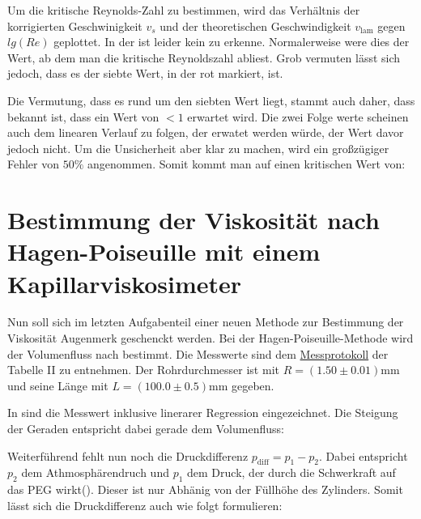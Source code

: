 Um die kritische Reynolds-Zahl zu bestimmen, wird das Verhältnis der korrigierten Geschwinigkeit $v_s$ und der theoretischen Geschwindigkeit $v_\text{lam}$ gegen $lg(Re)$ geplottet. 
In der  ist leider kein  zu erkenne. Normalerweise were dies der Wert, ab dem man die kritische Reynoldszahl abliest. Grob vermuten lässt sich jedoch, dass es der siebte Wert, in der  rot markiert, ist.


Die Vermutung, dass es rund um den siebten Wert liegt, stammt auch daher, dass bekannt ist, dass ein Wert von $<1$ erwartet wird. Die zwei Folge werte scheinen auch dem linearen Verlauf zu folgen, der erwatet werden würde, der Wert davor jedoch nicht. Um die Unsicherheit aber klar zu machen, wird ein großzügiger Fehler von $50\%$ angenommen. Somit kommt man auf einen kritischen Wert von:


\section{Bestimmung der Viskosität nach Hagen-Poiseuille mit einem Kapillarviskosimeter}
\label{sec:A3}
Nun soll sich im letzten Aufgabenteil einer neuen Methode zur Bestimmung der Viskosität Augenmerk geschenckt werden.
Bei der Hagen-Poiseuille-Methode wird der Volumenfluss nach  bestimmt. Die Messwerte sind dem \hyperref[ch:Protokoll]{Messprotokoll} der Tabelle II zu entnehmen. Der Rohrdurchmesser ist mit $R = (1.50 \pm 0.01) \mathrm{mm}$ und seine Länge mit $L = (100.0 \pm 0.5)\mathrm{mm} $ gegeben. \cite{skriptPAP21}


In  sind die Messwert inklusive linerarer Regression eingezeichnet. Die Steigung der Geraden entspricht dabei gerade dem Volumenfluss:


Weiterführend fehlt nun noch die Druckdifferenz $p_\text{diff} = p_1 - p_2$. Dabei entspricht $p_2$ dem Athmosphärendruch und $p_1$ dem Druck, der durch die Schwerkraft auf das PEG wirkt(). Dieser ist nur Abhänig von der Füllhöhe des Zylinders.
Somit lässt sich die Druckdifferenz auch wie folgt formulieren:

